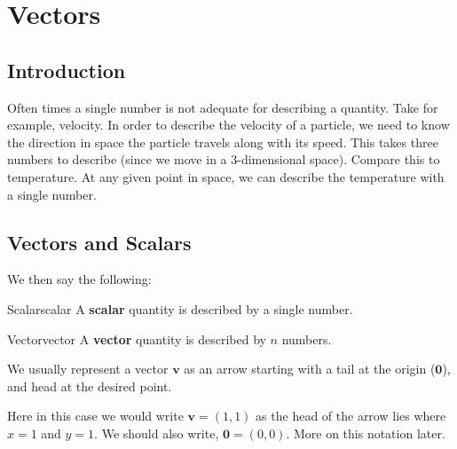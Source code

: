 
    \chapter{Vectors}
    \section*{Introduction}
        Often times a single number is not adequate for describing a quantity.  Take for example, velocity.  In order to describe the velocity of a particle, we need to know the direction in space the particle travels along with its speed.  This takes three numbers to describe (since we move in a 3-dimensional space). Compare this to temperature.  At any given point in space, we can describe the temperature with a single number. 
        
        \section{Vectors and Scalars}
        
        We then say the following:
        
        \begin{df}{Scalar}{scalar}
        A \textbf{scalar}  quantity is described by a single number.  
        \end{df}
        
        \begin{df}{Vector}{vector}
        A \textbf{vector}  quantity is described by $n$ numbers. 
        \end{df}
        
        We usually represent a vector $\mathbf{v}$ as an arrow starting with a tail at the origin ($\mathbf{0}$), and head at the desired point.  
        
        \begin{center}
        \end{center}
        
        Here in this case we would write $\mathbf{v}=(1,1)$ as the head of the arrow lies where $x=1$ and $y=1$. We should also write, $\mathbf{0}=(0,0)$. More on this notation later.
        
